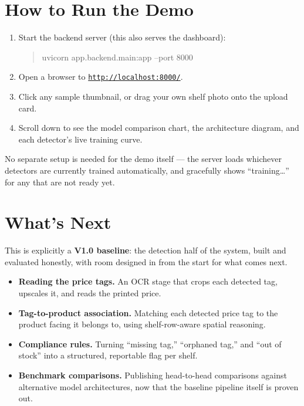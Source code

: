 \documentclass[11pt,a4paper]{article}
\begin{document}
\section{How to Run the Demo}

\begin{enumerate}
  \item Start the backend server (this also serves the dashboard):
\begin{quote}\monofont\small
uvicorn app.backend.main:app --port 8000
\end{quote}
  \item Open a browser to \href{http://localhost:8000/}{\texttt{http://localhost:8000/}}.
  \item Click any sample thumbnail, or drag your own shelf photo onto the upload card.
  \item Scroll down to see the model comparison chart, the architecture diagram, and each
        detector's live training curve.
\end{enumerate}

\begin{notebox}
No separate setup is needed for the demo itself --- the server loads whichever detectors are
currently trained automatically, and gracefully shows ``training…'' for any that are not ready
yet.
\end{notebox}

\section{What's Next}

This is explicitly a \textbf{V1.0 baseline}: the detection half of the system, built and
evaluated honestly, with room designed in from the start for what comes next.

\begin{itemize}
  \item \textbf{Reading the price tags.} An OCR stage that crops each detected tag, upscales it,
        and reads the printed price.
  \item \textbf{Tag-to-product association.} Matching each detected price tag to the product
        facing it belongs to, using shelf-row-aware spatial reasoning.
  \item \textbf{Compliance rules.} Turning ``missing tag,'' ``orphaned tag,'' and ``out of
        stock'' into a structured, reportable flag per shelf.
  \item \textbf{Benchmark comparisons.} Publishing head-to-head comparisons against alternative
        model architectures, now that the baseline pipeline itself is proven out.
\end{itemize}
\end{document}
